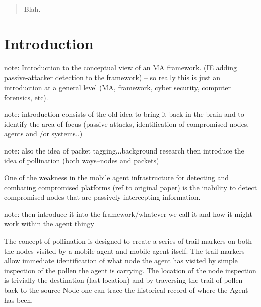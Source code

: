 \documentclass{acm_proc_article-sp}
\begin{document}
\maketitle
\begin{abstract}
Blah.
\end{abstract}




\section{Introduction}
note: Introduction to the conceptual view of an MA framework. (IE adding passive-attacker detection to the framework) -- so really this is just an introduction at a general level (MA, framework, cyber security, computer forensics, etc).

note: introduction consists of the old idea to bring it back in the brain and to identify the area of focus (passive attacks, identification of compromised nodes, agents and /or systems..)

note: also the idea of packet tagging...background research then introduce the idea of pollination (both ways--nodes and packets)

One of the weakness in the mobile agent infrastructure for detecting and combating compromised platforms (ref to original paper) is the inability to detect compromised nodes that are passively intercepting information.

note: then introduce it into the framework/whatever we call it and how it might work within the agent thingy

The concept of pollination is designed to create a series of trail markers on both the nodes visited by a mobile agent and mobile agent itself. The trail markers allow immediate identification of what node the agent has visited by simple inspection of the pollen the agent is carrying. The location of the node inspection is trivially the destination (last location) and by traversing the trail of pollen back to the source Node one can trace the historical record of where the Agent has been.
\end{document}
